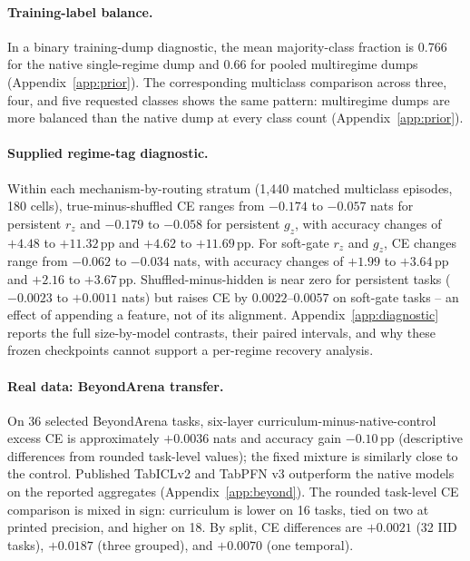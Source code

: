 \documentclass{article}
\newcommand{\pp}{\,\mathrm{pp}}
\begin{document}


\paragraph{Training-label balance.} In a binary training-dump diagnostic, the mean majority-class fraction is 0.766 for the native single-regime dump and 0.66 for pooled multiregime dumps (Appendix~\ref{app:prior}). The corresponding multiclass comparison across three, four, and five requested classes shows the same pattern: multiregime dumps are more balanced than the native dump at every class count (Appendix~\ref{app:prior}).

\paragraph{Supplied regime-tag diagnostic.} Within each mechanism-by-routing stratum (1,440 matched multiclass episodes, 180 cells), true-minus-shuffled CE ranges from $-0.174$ to $-0.057$ nats for persistent $r_z$ and $-0.179$ to $-0.058$ for persistent $g_z$, with accuracy changes of $+4.48$ to $+11.32\pp$ and $+4.62$ to $+11.69\pp$. For soft-gate $r_z$ and $g_z$, CE changes range from $-0.062$ to $-0.034$ nats, with accuracy changes of $+1.99$ to $+3.64\pp$ and $+2.16$ to $+3.67\pp$. Shuffled-minus-hidden is near zero for persistent tasks ($-0.0023$ to $+0.0011$ nats) but raises CE by $0.0022$--$0.0057$ on soft-gate tasks -- an effect of appending a feature, not of its alignment. Appendix~\ref{app:diagnostic} reports the full size-by-model contrasts, their paired intervals, and why these frozen checkpoints cannot support a per-regime recovery analysis.

\paragraph{Real data: BeyondArena transfer.} On 36 selected BeyondArena tasks, six-layer curriculum-minus-native-control excess CE is approximately $+0.0036$ nats and accuracy gain $-0.10\pp$ (descriptive differences from rounded task-level values); the fixed mixture is similarly close to the control. Published TabICLv2 and TabPFN v3 outperform the native models on the reported aggregates (Appendix~\ref{app:beyond}). The rounded task-level CE comparison is mixed in sign: curriculum is lower on 16 tasks, tied on two at printed precision, and higher on 18. By split, CE differences are $+0.0021$ (32 IID tasks), $+0.0187$ (three grouped), and $+0.0070$ (one temporal).
\end{document}
